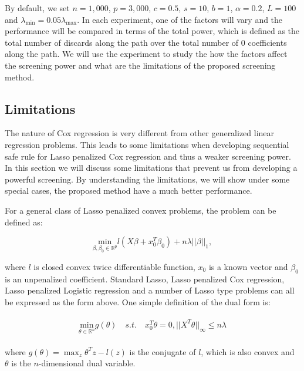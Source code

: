 By default, we set $n=1,000$, $p=3,000$, $c=0.5$, $s=10$, $b=1$, $\alpha=0.2$, $L=100$ and $\lambda_{\min}=0.05\lambda_{\max}$. In each experiment, one of the factors will vary and the performance will be compared in terms of the total power, which is defined as the total number of discards along the path over the total number of 0 coefficients along the path. We will use the experiment to study the how the factors affect the screening power and what are the limitations of the proposed screening method.

\subsection{Limitations}


The nature of Cox regression is very different from other generalized linear regression problems. This leads to some limitations when developing sequential safe rule for Lasso penalized Cox regression and thus a weaker screening power. In this section we will discuss some limitations that prevent us from developing a powerful screening. By understanding the limitations, we will show under some special cases, the proposed method have a much better performance.


For a general class of Lasso penalized convex problems, the problem can be defined as:

\begin{equation}
    \underset{\beta,\beta_0\in \mathbb{R}^p}{\mathrm{min}}l(X\beta+x_0^T\beta_0)+n\lambda||\beta||_1,
\end{equation}

where $l$ is closed convex twice differentiable function, $x_0$ is a known vector and $\beta_0$ is an unpenalized coefficient. Standard Lasso, Lasso penalized Cox regression, Lasso penalized Logistic regression and a number of Lasso type problems can all be expressed as the form above. One simple definition of the dual form is:

\begin{gather}
    \begin{aligned}
         \underset{\theta\in \mathbb{R}^n}{\mathrm{min}} g(\theta)\quad s.t.\quad x_0^T\theta=0,||X^T\theta||_\infty\leq n\lambda
    \end{aligned}
\end{gather}

where $g(\theta)=\max_z \theta^Tz-l(z)$ is the conjugate of $l$, which is also convex and $\theta$ is the $n$-dimensional dual variable.

